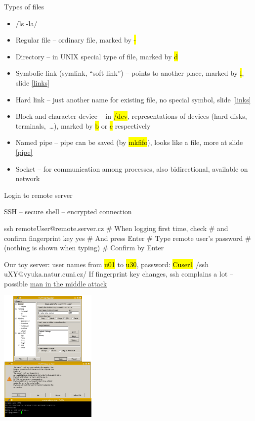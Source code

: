\documentclass[compress, ucs, xelatex, 11pt, xcolor=svgnames,
  hyperref={
    bookmarks=true,
    unicode=true,
    colorlinks=true,
    pdftitle={Linux, command line and MetaCentrum},
    plainpages=false,
    pdfauthor={Vojtech Zeisek},
    pdfsubject={Course about use of Linux command line, writing shell scripts and using MetaCentrum of CESNET},
    pdfcreator={XeLaTeX},
    pdfkeywords={Linux, GNU, BASH, shell, command line, MetaCentrum},
    linkcolor=DarkRed,
    anchorcolor=DarkBlue,
    citecolor=Indigo,
    filecolor=NavyBlue,
    menucolor=DarkMagenta,
    urlcolor=DarkBlue,
    pdftex},
  url={hyphens, lowtilde} %
  ]{beamer}
\renewcommand{\texttt}[1]{\hl{\ttfamily #1}}
\begin{document}
\begin{frame}{Types of files}
\begin{itemize}
  \item \bash/ls -la/
  \item Regular file -- ordinary file, marked by \texttt{-}
  \item Directory -- in UNIX special type of file, marked by \texttt{d}
  \item Symbolic link (symlink, ``soft link'') -- points to another place, marked by \texttt{l}, slide \ref{links}
  \item Hard link -- just another name for existing file, no special symbol, slide \ref{links}
  \item Block and character device -- in \texttt{/dev}, representations of devices (hard disks, terminals,~\ldots), marked by \texttt{b} or \texttt{c} respectively
  \item Named pipe -- pipe can be saved (by \texttt{mkfifo}), looks like a file, more at slide \ref{pipe}
  \item Socket -- for communication among processes, also bidirectional, available on network
\end{itemize}
\end{frame}

\begin{frame}[fragile]{Login to remote server}
\begin{multicols}{2}
  \vfill
  SSH -- secure shell -- encrypted connection
  \vfill
  \begin{bashcode}
    ssh remoteUser@remote.server.cz
    # When logging first time, check
    # and confirm fingerprint key
    yes # And press Enter
    # Type remote user's password
    # (nothing is shown when typing)
    # Confirm by Enter
  \end{bashcode}
  \vfill
  Our toy server: user names from \texttt{u01} to \texttt{u30}, password: \texttt{Cuser1}
  \vfill
  \bash/ssh uXY@vyuka.natur.cuni.cz/
  \vfill
  If fingerprint key changes, ssh complains a lot -- possible \href{https://en.wikipedia.org/wiki/Man-in-the-middle_attack}{man in the middle attack}
  \vfill
  \begin{center}
    \includegraphics[height=6.5cm]{putty.png}
  \end{center}
\end{multicols}
\end{frame}
\end{document}

